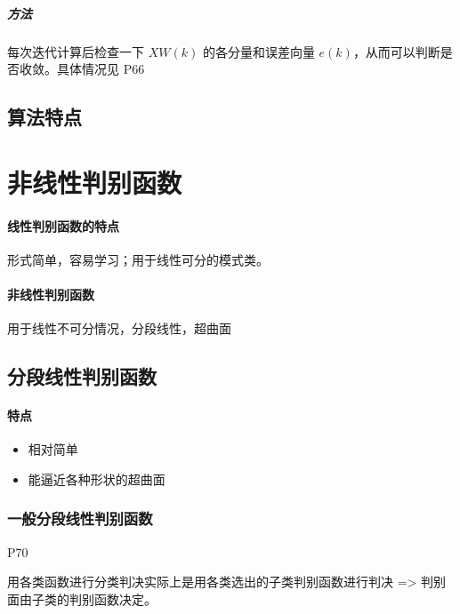 \documentclass[11pt]{book}
\begin{document}
\subparagraph{方法}%
\label{par:fang_fa_}

每次迭代计算后检查一下 $XW(k)$ 的各分量和误差向量 $e(k)$，从而可以判断是否收敛。具体情况见 P66



\subsection{算法特点}

\section{非线性判别函数}

\paragraph{线性判别函数的特点}%
\label{par:xian_xing_pan_bie_han_shu_de_te_dian_}

形式简单，容易学习；用于线性可分的模式类。

\paragraph{非线性判别函数}%
\label{par:fei_xian_xing_pan_bie_han_shu_}

用于线性不可分情况，分段线性，超曲面

\subsection{分段线性判别函数}

\paragraph{特点}%
\label{par:te_dian_}

\begin{itemize}
	\item 相对简单
	\item 能逼近各种形状的超曲面
\end{itemize}

\subsubsection{一般分段线性判别函数}%
\label{ssub:yi_ban_fen_duan_xian_xing_pan_bie_han_shu_}

P70

用各类函数进行分类判决实际上是用各类选出的子类判别函数进行判决 => 判别面由子类的判别函数决定。
\end{document}
